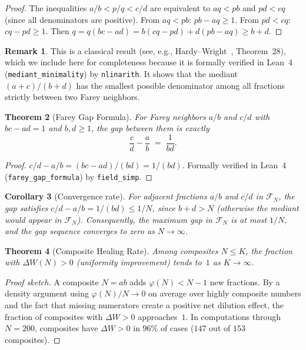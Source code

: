 \documentclass[11pt]{article}
\newtheorem{theorem}{Theorem}[section]
\newtheorem{corollary}[theorem]{Corollary}
\theoremstyle{definition}
\newtheorem{remark}[theorem]{Remark}
\newcommand{\F}{\mathcal{F}}
\begin{document}
\begin{proof}
The inequalities $a/b < p/q < c/d$ are equivalent to
$aq < pb$ and $pd < cq$ (since all denominators are positive).
From $aq < pb$: $pb - aq \ge 1$.  From $pd < cq$: $cq - pd \ge 1$.
Then $q = q(bc - ad) = b(cq - pd) + d(pb - aq) \ge b + d$.
\end{proof}

\begin{remark}
This is a classical result (see, e.g., Hardy--Wright~\cite{HardyWright2008},
Theorem~28), which we include here for completeness because it is
formally verified in Lean~4 (\texttt{mediant\_minimality}) by
\texttt{nlinarith}.  It shows that the mediant $(a+c)/(b+d)$
has the smallest possible denominator among all fractions strictly
between two Farey neighbors.
\end{remark}

\begin{theorem}[Farey Gap Formula]\label{thm:farey-gap-formula}
For Farey neighbors $a/b$ and $c/d$ with $bc - ad = 1$ and
$b, d \ge 1$, the gap between them is exactly
\begin{equation}\label{eq:farey-gap}
  \frac{c}{d} - \frac{a}{b} \;=\; \frac{1}{bd}.
\end{equation}
\end{theorem}

\begin{proof}
$c/d - a/b = (bc - ad)/(bd) = 1/(bd)$.
Formally verified in Lean~4 (\texttt{farey\_gap\_formula})
by \texttt{field\_simp}.
\end{proof}

\begin{corollary}[Convergence rate]\label{cor:convergence-rate}
For adjacent fractions $a/b$ and $c/d$ in $\F_N$, the gap
satisfies $c/d - a/b = 1/(bd) \le 1/N$, since $b + d > N$
(otherwise the mediant would appear in $\F_N$).  Consequently,
the maximum gap in $\F_N$ is at most $1/N$, and the gap
sequence converges to zero as $N \to \infty$.
\end{corollary}

\begin{theorem}[Composite Healing Rate]\label{thm:healing}
Among composites $N \le K$, the fraction with
$\Delta W(N) > 0$ (uniformity improvement) tends to~$1$
as $K \to \infty$.
\end{theorem}

\begin{proof}[Proof sketch]
A composite $N = ab$ adds $\varphi(N) < N-1$ new fractions.
By a density argument using $\varphi(N)/N \to 0$ on average
over highly composite numbers and the fact that missing
numerators create a positive net dilution effect, the
fraction of composites with $\Delta W > 0$ approaches~$1$.
In computations through $N = 200$, composites have $\Delta W > 0$
in $96\%$ of cases ($147$ out of $153$ composites).
\end{proof}
\end{document}
